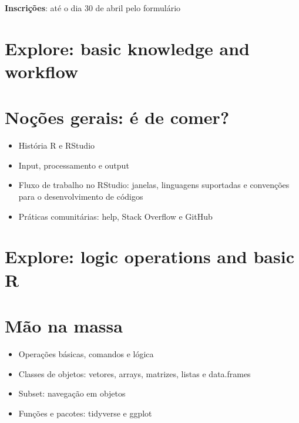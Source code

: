 \documentclass[a4paper,12pt]{article}
\begin{document}
\vspace{0.5cm}

\textbf{Inscrições}: até o dia 30 de abril pelo formulário 



\section{Explore: basic knowledge and workflow}
\section*{Noções gerais: é de comer?}

\begin{itemize}
    \item História R e RStudio \cite{ihaka_r_1996}\cite{ihaka_r_1998}

    \item Input, processamento e output

    \item Fluxo de trabalho no RStudio: janelas, linguagens suportadas e convenções para o desenvolvimento de códigos

    \item Práticas comunitárias: help, Stack Overflow e GitHub
\end{itemize}


\section{Explore: logic operations and basic R}
\section*{Mão na massa}

\begin{itemize}
    \item Operações básicas, comandos e lógica

    \item Classes de objetos: vetores, arrays, matrizes, listas e data.frames

    \item Subset: navegação em objetos

    \item Funções e pacotes: tidyverse e ggplot
\end{itemize}
\end{document}
